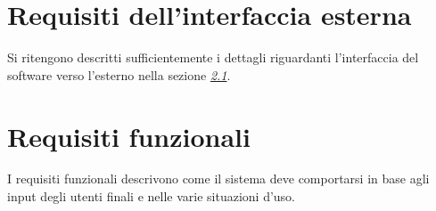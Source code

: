 \documentclass{scrreprt}
\begin{document}

\section{Requisiti dell'interfaccia esterna}
Si ritengono descritti sufficientemente i dettagli riguardanti l'interfaccia del software verso l'esterno nella sezione \hyperref[sec:inquadramento]{\textit{2.1}}. 


\section{Requisiti funzionali}
%
%
%


I requisiti funzionali descrivono come il sistema deve comportarsi in base agli input degli utenti finali e nelle varie situazioni d'uso.

\newcommand{\specialcell}[2][c]{%
  \begin{tabular}[#1]{@{}l@{}}#2\end{tabular}}
\end{document}
